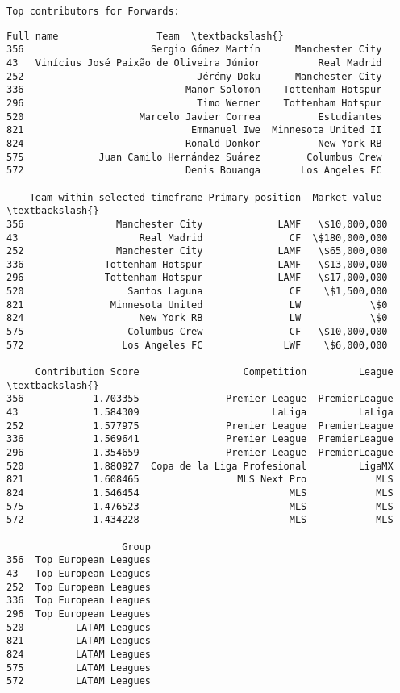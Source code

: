 \documentclass[11pt]{article}
\makeatletter
\newcommand{\boxspacing}{\kern\kvtcb@left@rule\kern\kvtcb@boxsep}
\newcommand{\prompt}[4]{
        {\ttfamily\llap{{\color{#2}[#3]:\hspace{3pt}#4}}\vspace{-\baselineskip}}
    }
\makeatother
\begin{document}
    \begin{Verbatim}[commandchars=\\\{\}]
Top contributors for Forwards:
    \end{Verbatim}

            \begin{tcolorbox}[breakable, size=fbox, boxrule=.5pt, pad at break*=1mm, opacityfill=0]
\prompt{Out}{outcolor}{47}{\boxspacing}
\begin{Verbatim}[commandchars=\\\{\}]
                                   Full name                 Team  \textbackslash{}
356                      Sergio Gómez Martín      Manchester City
43   Vinícius José Paixão de Oliveira Júnior          Real Madrid
252                              Jérémy Doku      Manchester City
336                            Manor Solomon    Tottenham Hotspur
296                              Timo Werner    Tottenham Hotspur
520                    Marcelo Javier Correa          Estudiantes
821                             Emmanuel Iwe  Minnesota United II
824                            Ronald Donkor          New York RB
575             Juan Camilo Hernández Suárez        Columbus Crew
572                            Denis Bouanga       Los Angeles FC

    Team within selected timeframe Primary position  Market value  \textbackslash{}
356                Manchester City             LAMF   \$10,000,000
43                     Real Madrid               CF  \$180,000,000
252                Manchester City             LAMF   \$65,000,000
336              Tottenham Hotspur             LAMF   \$13,000,000
296              Tottenham Hotspur             LAMF   \$17,000,000
520                  Santos Laguna               CF    \$1,500,000
821               Minnesota United               LW            \$0
824                    New York RB               LW            \$0
575                  Columbus Crew               CF   \$10,000,000
572                 Los Angeles FC              LWF    \$6,000,000

     Contribution Score                  Competition         League  \textbackslash{}
356            1.703355               Premier League  PremierLeague
43             1.584309                       LaLiga         LaLiga
252            1.577975               Premier League  PremierLeague
336            1.569641               Premier League  PremierLeague
296            1.354659               Premier League  PremierLeague
520            1.880927  Copa de la Liga Profesional         LigaMX
821            1.608465                 MLS Next Pro            MLS
824            1.546454                          MLS            MLS
575            1.476523                          MLS            MLS
572            1.434228                          MLS            MLS

                    Group
356  Top European Leagues
43   Top European Leagues
252  Top European Leagues
336  Top European Leagues
296  Top European Leagues
520         LATAM Leagues
821         LATAM Leagues
824         LATAM Leagues
575         LATAM Leagues
572         LATAM Leagues
\end{Verbatim}
\end{tcolorbox}
        
\end{document}
